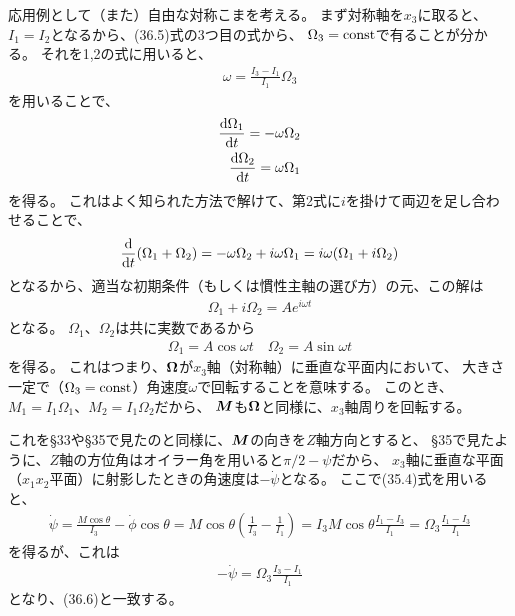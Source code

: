 \documentclass[a4paper]{jsarticle}
\def\vec#1{\mbox{\boldmath $#1$}}
\newcommand{\dif}[2]{\frac{{\rm d} #1}{{\rm d} #2}}
\begin{document}
応用例として（また）自由な対称こまを考える。
まず対称軸を$x_3$に取ると、$I_1 = I_2$となるから、(36.5)式の3つ目の式から、
$\Omega_3 = {\rm const}$で有ることが分かる。
それを1,2の式に用いると、
\begin{align}
	\omega = \frac{I_3 - I_1}{I_1} \Omega_3
	\tag{36.5}
\end{align}
を用いることで、
\begin{align}
	\dif{\Omega_1}{t} = -\omega \Omega_2 \\
	\dif{\Omega_2}{t} = \omega \Omega_1
\end{align}
を得る。
これはよく知られた方法で解けて、第2式に$i$を掛けて両辺を足し合わせることで、
\begin{align}
	\dif{}{t} (\Omega_1 + \Omega_2) = -\omega \Omega_2 + i \omega \Omega_1
	= i \omega (\Omega_1 + i \Omega_2)
\end{align}
となるから、適当な初期条件（もしくは慣性主軸の選び方）の元、この解は
\begin{align}
	\Omega_1 + i \Omega_2 = A e^{i \omega t}
\end{align}
となる。
$\Omega_1$、$\Omega_2$は共に実数であるから
\begin{align}
	\Omega_1 = A \cos\omega t \quad
	\Omega_2 = A \sin\omega t
	\tag{36.7}
\end{align}
を得る。
これはつまり、$\vec{\Omega}$が$x_3$軸（対称軸）に垂直な平面内において、
大きさ一定で（$\Omega_3 = {\rm const}$）角速度$\omega$で回転することを意味する。
このとき、$M_1 = I_1 \Omega_1$、$M_2 = I_1 \Omega_2$だから、
$\vec{M}$も$\vec{\Omega}$と同様に、$x_3$軸周りを回転する。

これを\S 33や\S 35で見たのと同様に、$\vec{M}$の向きを$Z$軸方向とすると、
\S 35で見たように、$Z$軸の方位角はオイラー角を用いると$\pi/2 - \psi$だから、
$x_3$軸に垂直な平面（$x_1x_2$平面）に射影したときの角速度は$-\dot{\psi}$となる。
ここで(35.4)式を用いると、
\begin{align}
	\dot{\psi} = \frac{M \cos\theta}{I_3} - \dot{\phi} \cos\theta
	= M \cos\theta \left( \frac{1}{I_3} - \frac{1}{I_1} \right)
	= I_3 M \cos\theta \frac{I_1 - I_3}{I_1}
	= \Omega_3 \frac{I_1 - I_3}{I_1}
\end{align}
を得るが、これは
\begin{align}
	-\dot{\psi} = \Omega_3 \frac{I_3 - I_1}{I_1}
\end{align}
となり、(36.6)と一致する。
\end{document}

